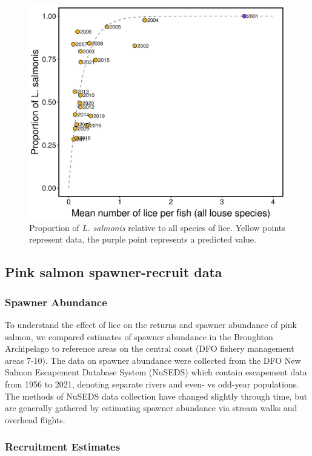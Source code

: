\documentclass{article}
\begin{document}
\begin{figure}[h]
    \centering
    \includegraphics[width=\textwidth]{images/predicted-lep-proportions.png}
    \caption{Proportion of \textit{L. salmonis} relative to all species of lice. Yellow points represent data, the purple point represents a predicted value.}
    \label{fig:lep-prop}
\end{figure}

\subsection{Pink salmon spawner-recruit data}

\subsubsection{Spawner Abundance}

To understand the effect of lice on the returns and spawner abundance of pink salmon, we compared estimates of spawner abundance in the Broughton Archipelago to reference areas on the central coast (DFO fishery management areas 7-10). The data on spawner abundance were collected from the DFO New Salmon Escapement Database System (NuSEDS) which contain escapement data from 1956 to 2021, denoting separate rivers and even- vs odd-year populations. The methods of NuSEDS data collection have changed slightly through time, but are generally gathered by estimating spawner abundance via stream walks and overhead flights. 

\subsubsection{Recruitment Estimates}
\end{document}
